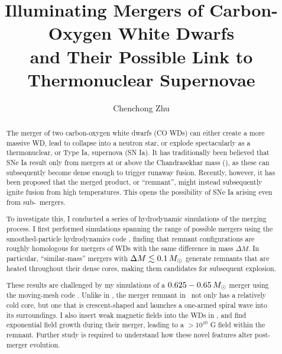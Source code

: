 \documentclass{ut-thesis}
\author{Chenchong Zhu}
\title{Illuminating Mergers of Carbon-Oxygen White Dwarfs \\
and Their Possible Link to Thermonuclear Supernovae}
\begin{document}
\begin{preliminary}

\maketitle


\begin{abstract}

The merger of two carbon-oxygen white dwarfs (CO WDs) can either create a more massive WD, lead to collapse into a neutron star, or explode spectacularly as a thermonuclear, or Type Ia, supernova (SN Ia).  It has traditionally been believed that SNe Ia result only from mergers at or above the Chandrasekhar mass (\Mch), as these can subsequently become dense enough to trigger runaway fusion.  Recently, however, it has been proposed that the merged product, or ``remnant'', might instead subsequently ignite fusion from high temperatures.  This opens the possibility of SNe Ia arising even from sub-\Mch\ mergers.  

To investigate this, I conducted a series of hydrodynamic simulations of the merging process.  I first performed simulations spanning the range of possible mergers using the smoothed-particle hydrodynamics code \gasoline, finding that remnant configurations are roughly homologous for mergers of WDs with the same difference in mass $\Delta M$.  In particular, ``similar-mass'' mergers with $\Delta M \lesssim 0.1\,\Msun$ generate remnants that are heated throughout their dense cores, making them candidates for subsequent explosion.

These results are challenged by my simulations of a $0.625 - 0.65\,\Msun$ merger using the moving-mesh code \arepo.  Unlike in \gasoline, the merger remnant in \arepo\ not only has a relatively cold core, but one that is crescent-shaped and launches a one-armed spiral wave into its surroundings.  I also insert weak magnetic fields into the WDs in \arepo, and find exponential field growth during their merger, leading to a $>10^{10}$ G field within the remnant.  Further study is required to understand how these novel features alter post-merger evolution.


\end{abstract}
\end{preliminary}
\end{document}
